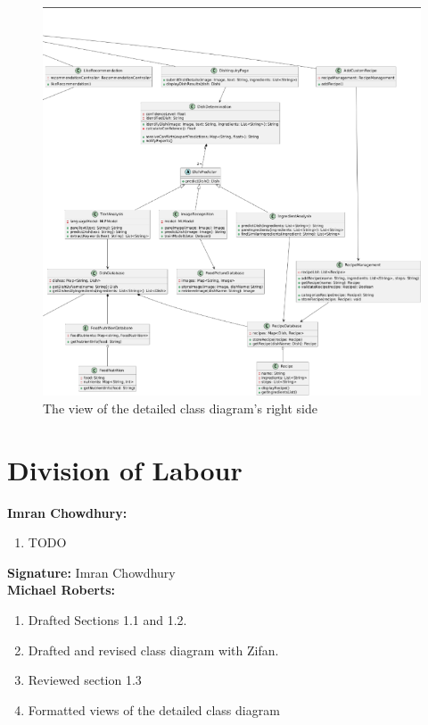 \documentclass[]{article}
\begin{document}
\begin{figure}[H]
	\centering
	\includegraphics[width=\textwidth]{image/classDiagRight.png}
	\caption{The view of the detailed class diagram's right side}
\end{figure}




\appendix
\section{Division of Labour}
\label{sec:division_of_labour}
\textbf{Imran Chowdhury:}
\begin{enumerate}
	\item TODO
\end{enumerate}

\textbf{Signature:} Imran Chowdhury \\

\textbf{Michael Roberts:}
\begin{enumerate}
	\item Drafted Sections 1.1 and 1.2.
	\item Drafted and revised class diagram with Zifan.
	\item Reviewed section 1.3
	\item Formatted views of the detailed class diagram
\end{enumerate}
\end{document}
